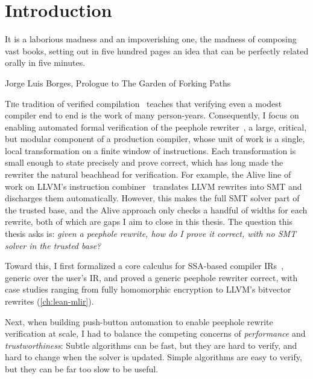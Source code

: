 \chapter{Introduction}
\label{ch:intro}
\epigraph{It is a laborious madness and an impoverishing one, the madness of composing vast books, setting out in five hundred pages an idea that can be perfectly related orally in five minutes.}{Jorge Luis Borges, Prologue to The Garden of Forking Paths}

\lettrine{T}he tradition of verified compilation~\citep{leroy2016compcert,kumar2014cakeml}
teaches that verifying even a modest compiler end to end is the work of many person-years.
Consequently, I focus on enabling automated formal verification of the peephole rewriter~\citep{mckeeman1965peephole},
a large, critical, but modular component of a production compiler,
whose unit of work is a single, local transformation on a finite window of instructions.
Each transformation is small enough to state precisely and prove correct,
which has long made the rewriter the natural beachhead for verification.
For example, the Alive line of work on LLVM's instruction combiner~\citep{lopes2015provably,lopes2021alive2}
translates LLVM rewrites into SMT and discharges them automatically.
However, this makes the full SMT solver part of the trusted base,
and the Alive approach only checks a handful of widths for each rewrite,
both of which are gaps I aim to close in this thesis.
The question this thesis asks is:
\emph{given a peephole rewrite, how do I prove it correct, with no SMT solver in the trusted base?}

Toward this, I first formalized a core calculus for SSA-based compiler IRs~\citep{appel1998ssa,rastello2022ssa},
generic over the user's IR, and proved a generic peephole rewriter correct,
with case studies ranging from fully homomorphic encryption to LLVM's bitvector rewrites (\cref{ch:lean-mlir}).

Next, when building push-button automation to enable peephole rewrite verification at scale,
I had to balance the competing concerns of \emph{performance} and \emph{trustworthiness}:
Subtle algorithms can be fast, but they are hard to verify, and hard to change when the solver is updated.
Simple algorithms are easy to verify, but they can be far too slow to be useful.

